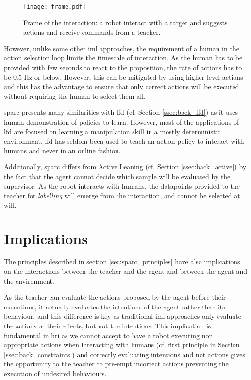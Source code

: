 \begin{figure}[ht]
	\texttt{[image: frame.pdf]}
	\centering
	\caption{Frame of the interaction: a robot interact with a target and suggests actions and receive commands from a teacher.}
	\label{fig:frame}
\end{figure}

However, unlike some other \gls{iml} approaches, the requirement of a human in the action selection loop limits the timescale of interaction. As the human has to be provided with few seconds to react to the proposition, the rate of actions has to be 0.5 Hz or below. However, this can be mitigated by using higher level actions and this has the advantage to ensure that only correct actions will be executed without requiring the human to select them all.

\gls{sparc} presents many similarities with \acrlong{lfd} (cf. Section \ref{ssec:back_lfd}) as it uses human demonstration of policies to learn. However, most of the applications of \gls{lfd} \citep{argall2009survey,billard2008robot} are focused on learning a manipulation skill in a mostly deterministic environment. \gls{lfd} has seldom been used to teach an action policy to interact with humans \citep{liu2014train,sequeira2016discovering} and never in an online fashion.

Additionally, \gls{sparc} differs from Active Leaning (cf. Section \ref{ssec:back_active}) by the fact that the agent cannot decide which sample will be evaluated by the supervisor. As the robot interacts with humans, the datapoints provided to the teacher for \textit{labelling} will emerge from the interaction, and cannot be selected at will. 
    
\section{Implications}

The principles described in section \ref{sec:sparc_principles} have also implications on the interactions between the teacher and the agent and between the agent and the environment.

As the teacher can evaluate the actions proposed by the agent before their executions, it actually evaluates the intentions of the agent rather than its behaviour, and this difference is key as traditional \gls{iml} approaches only evaluate the actions or their effects, but not the intentions. This implication is fundamental in \gls{hri} as we cannot accept to have a robot executing non appropriate actions when interacting with humans (cf. first principle in Section \ref{ssec:back_constraints}) and correctly evaluating intentions and not actions gives the opportunity to the teacher to pre-empt incorrect actions preventing the execution of undesired behaviours.

